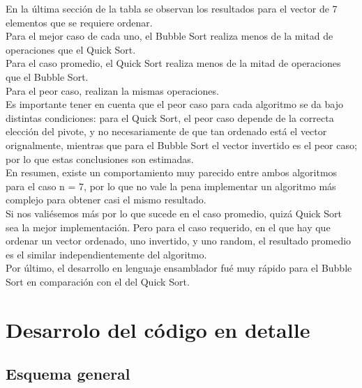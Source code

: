 \documentclass{sciposter}
\begin{document}
\begin{multicols*}{2}
En la última sección de la tabla se observan los resultados para el vector de 7 elementos que se requiere ordenar.\\
Para el mejor caso de cada uno, el Bubble Sort realiza menos de la mitad de operaciones que el Quick Sort.\\
Para el caso promedio, el Quick Sort realiza menos de la mitad de operaciones que el Bubble Sort.\\
Para el peor caso, realizan la mismas operaciones.\\

Es importante tener en cuenta que el peor caso para cada algoritmo se da bajo distintas condiciones: para el Quick Sort, el peor caso depende de la correcta elección del pivote, y no necesariamente de que tan ordenado está el vector orignalmente, mientras que para el Bubble Sort el vector invertido es el peor caso; por lo que estas conclusiones son estimadas.\\

En resumen, existe un comportamiento muy parecido entre ambos algoritmos para el caso n = 7, por lo que no vale la pena implementar un algoritmo más complejo para obtener casi el mismo resultado.\\
Si nos valiésemos más por lo que sucede en el caso promedio, quizá Quick Sort sea la mejor implementación. Pero para el caso requerido, en el que hay que ordenar un vector ordenado, uno invertido, y uno random, el resultado promedio es el similar independientemente del algoritmo.\\

Por último, el desarrollo en lenguaje ensamblador fué muy rápido para el Bubble Sort en comparación con el del Quick Sort.\\

\section{Desarrolo del código en detalle}

\subsection{Esquema general}


\end{multicols*}
\end{document}
